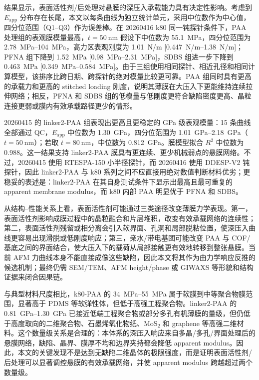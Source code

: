 \documentclass[UTF8,11pt]{ctexart}
\begin{document}
结果显示，表面活性剂/后处理对悬膜的深压入承载能力具有决定性影响。考虑到 $E_{\mathrm{app}}$ 分布存在长尾，本文以每条曲线为独立统计单元，采用中位数作为中心值，四分位范围（Q1--Q3）作为误差棒。在 20260416 k80 同一钝探针条件下，PAA 处理组的表观膜模量最高，$t=\SI{50}{\nano\meter}$ 假设下中位数为 \SI{55.1}{MPa}，四分位范围为 \SIrange{2.78}{104}{MPa}，高力区表观刚度为 \SI{1.01}{N/m} [\SIrange{0.447}{1.38}{N/m}]；PFNA 组下降到 \SI{1.52}{MPa} [\SIrange{0.98}{2.31}{MPa}]，SDBS 组进一步下降到 \SI{0.463}{MPa} [\SIrange{0.349}{0.584}{MPa}]。由于三组使用相同探针、相近孔径和相同计算模型，该排序比跨日期、跨探针的绝对模量比较更可靠。PAA 组同时具有更高的承载力和更高的 stitched loading 刚度，说明其薄膜在大压入下更能维持连续拉伸网络；相反，PFNA 和 SDBS 组的低模量与低刚度更符合缺陷密度更高、晶粒连接更弱或膜内有效承载路径更少的情形。

20260415 的 linker2-PAA 组表现出更高且更稳定的 GPa 级表观模量：15 条曲线全部通过 QC，$E_{\mathrm{app}}$ 中位数为 \SI{1.30}{GPa}，四分位范围为 \SIrange{1.01}{2.18}{GPa}（$t=\SI{50}{\nano\meter}$）；若取 $t=\SI{80}{\nano\meter}$，中位数为 \SI{0.812}{GPa}。膜模型拟合 $R^2$ 中位数为 0.988。这一结果支持 linker2-PAA 膜具有更连续、更少机械弱点的悬膜网络。不过，20260415 使用 RTESPA-150 小半径探针，而 20260416 使用 DDESP-V2 钝探针，因此 linker2-PAA 与 k80 系列之间不应直接用绝对数值判断材料优劣；更稳妥的表述是：linker2-PAA 在其自身测试条件下显示出最高且最可重复的 apparent membrane modulus，而 k80 内部 PAA 明显优于 PFNA 和 SDBS。

从结构--性能关系上看，表面活性剂可能通过三类途径改变薄膜力学表现。第一，表面活性剂影响成膜过程中的晶粒融合和片层堆积，改变有效承载网络的连续性；第二，表面活性剂残留或相分离会引入软界面、孔洞和局部脱粘位置，使深压入曲线更容易出现滑脱或低刚度响应；第三，亲水/带电基团可能改变 PAA 与 COF/基底之间的界面结合，使大压入下的载荷从局部接触更有效地转移到整张悬膜。当前 AFM 力曲线本身不能直接成像这些缺陷，因此本文将其作为由力学响应反推的候选机制；最终仍需 SEM/TEM、AFM height/phase 或 GIWAXS 等形貌和结构证据来闭合因果链。

与典型材料尺度相比，k80-PAA 的 \SIrange{34}{55}{MPa} 属于软膜到中等聚合物膜范围，显著高于 PDMS 等软弹性体，但低于高强工程聚合物。linker2-PAA 的 \SIrange{0.81}{1.30}{GPa} 已接近低端工程聚合物或部分多孔有机薄膜的量级，但仍低于高度取向的二维聚合物、石墨烯氧化物纸、MoS$_2$ 和 graphene 等高强二维材料。这个数量级关系是合理的：本体系的深压入响应来自多晶/多孔/界面处理后的悬膜网络，缺陷、晶界、膜厚不均和边界夹持都会降低 apparent modulus。因此，本文的关键发现不是达到无缺陷二维晶体的极限强度，而是证明表面活性剂/后处理可以显著调控悬膜的有效承载网络，并使 apparent modulus 跨越超过两个数量级。
\end{document}
